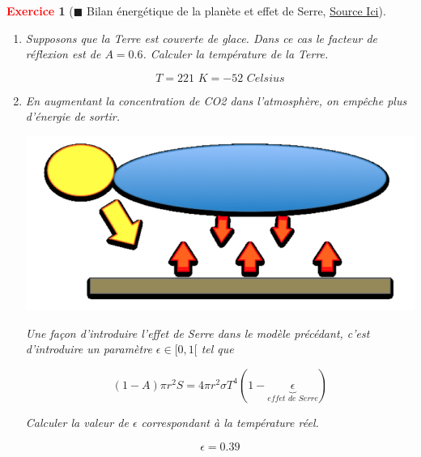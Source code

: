 \documentclass[11pt]{article}
\theoremstyle{mythmstyle}
\newtheorem{exo}{\textcolor{red}{\textbf{Exercice}}}
\begin{document}
\begin{exo}[$\blacksquare$ Bilan énergétique de la planète et effet de Serre, \href{http://step.ipgp.fr/images/e/ec/Bernard_geodynext_td1_corr.pdf}{Source Ici}]
\begin{enumerate}
\begin{solution}
$$
E_{entrant}=E_{sortant}
$$

$$
(1-A)\pi r^2 S= 4\pi r^2 \sigma T^4
$$

\noindent donc

$$
T=(\frac{(1-A) S}{4.\sigma})^{\frac{1}{4}}=( \frac{0.66\times 1.37\times 10^3}{4\times 5.67\times 10^{-8}})^{\frac{1}{4}}=255 K= -18\,\,\,Celsius
$$

En réalité, la température moyenne globale est de $14 \,\,Celsius$. La différence est provoquée par l'effet de Serre: l'atmosphère empêche que une petit partie de l'énergie s'échappe.
\end{solution}

\item Supposons que la Terre est couverte de glace. Dans ce cas le facteur de réflexion est de $A= 0.6$. Calculer la température de la Terre.

\begin{solution}
$$T= 221\,\, K = -52 \,\, Celsius$$
\end{solution}

\item En augmentant la concentration de CO2 dans l'atmosphère, on empêche plus d'énergie de sortir.

\begin{center}
    \includegraphics[scale=0.3]{serre2.png}
\end{center}

Une façon d'introduire l'effet de Serre dans le modèle précédant, c'est d'introduire un paramètre $\epsilon\in [0,1[$ tel que

$$
(1-A)\pi r^2 S= 4\pi r^2 \sigma T^4 (1-\underbrace{\epsilon}_{effet\,\,de\,\,Serre})
$$

Calculer la valeur de $\epsilon$ correspondant à la température réel.

\begin{solution}
$$\epsilon=0.39$$
\end{solution}


\end{enumerate}
\end{exo}
\end{document}
